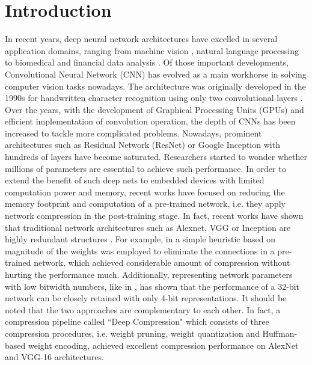 \documentclass[conference,usletter]{IEEEtran}
\begin{document}
\section{Introduction}\label{S:Intro}
In recent years, deep neural network architectures have excelled in several application domains, ranging from machine vision \cite{girshick2014rich, redmon2016you, waris2017cnn}, natural language processing \cite{hinton2012deep, graves2013speech} to biomedical \cite{zabihi2016heart, an2014deep} and financial data analysis \cite{tsantekidis2017using, tsantekidis2017forecasting}. Of those important developments, Convolutional Neural Network (CNN) has evolved as a main workhorse in solving computer vision tasks nowadays. The architecture was originally developed in the 1990s for handwritten character recognition using only two convolutional layers \cite{lecun1998gradient}. Over the years, with the development of Graphical Processing Units (GPUs) and efficient implementation of convolution operation, the depth of CNNs has been increased to tackle more complicated problems. Nowadays, prominent architectures such as Residual Network (ResNet) \cite{he2016deep} or Google Inception \cite{szegedy2015going} with hundreds of layers have become saturated. Researchers started to wonder whether millions of parameters are essential to achieve such performance. In order to extend the benefit of such deep nets to embedded devices with limited computation power and memory, recent works have focused on reducing the memory footprint and computation of a pre-trained network, i.e. they apply network compression in the post-training stage. In fact, recent works have shown that traditional network architectures such as Alexnet, VGG or Inception are highly redundant structures \cite{han2015deep,guo2016dynamic,chen2015compressing,wen2016learning,gong2014compressing,lin2016fixed,tai2015convolutional,denton2014exploiting,jaderberg2014speeding,ioannou2015training}. For example, in \cite{han2015deep} a simple heuristic based on magnitude of the weights was employed to eliminate the connections in a pre-trained network, which achieved considerable amount of compression without hurting the performance much. Additionally, representing network parameters with low bitwidth numbers, like in \cite{hubara2016quantized,gysel2016hardware,zhou2017balanced}, has shown that the performance of a 32-bit network can be closely retained with only 4-bit representations. It should be noted that the two approaches are complementary to each other. In fact, a compression pipeline called ``Deep Compression" \cite{han2015deep} which consists of three compression procedures, i.e. weight pruning, weight quantization and Huffman-based weight encoding, achieved excellent compression performance on AlexNet and VGG-16 architectures.
\end{document}
